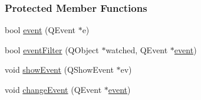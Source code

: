 \subsubsection*{Protected Member Functions}
\begin{DoxyCompactItemize}
\item 
bool \mbox{\hyperlink{classGeneralSettingDialog_ab8a8c443ea722ca23024025efbcfa768}{event}} (Q\+Event $\ast$e)
\item 
bool \mbox{\hyperlink{classGeneralSettingDialog_a2e5fc0aa0ac5f04fcfb032d65c1893a4}{event\+Filter}} (Q\+Object $\ast$watched, Q\+Event $\ast$\mbox{\hyperlink{classGeneralSettingDialog_ab8a8c443ea722ca23024025efbcfa768}{event}})
\item 
void \mbox{\hyperlink{classGeneralSettingDialog_a023c0f13fee36afb784b0ac7507f0fd2}{show\+Event}} (Q\+Show\+Event $\ast$ev)
\item 
void \mbox{\hyperlink{classGeneralSettingDialog_aecac66d55350cfbe21c6bac6f5476099}{change\+Event}} (Q\+Event $\ast$\mbox{\hyperlink{classGeneralSettingDialog_ab8a8c443ea722ca23024025efbcfa768}{event}})
\end{DoxyCompactItemize}
